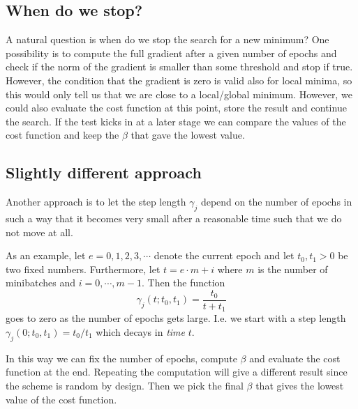 \documentclass[%
oneside,                 %
final,                   %
10pt]{article}
\begin{document}
\subsection*{When do we stop?}

A natural question is when do we stop the search for a new minimum?
One possibility is to compute the full gradient after a given number
of epochs and check if the norm of the gradient is smaller than some
threshold and stop if true. However, the condition that the gradient
is zero is valid also for local minima, so this would only tell us
that we are close to a local/global minimum. However, we could also
evaluate the cost function at this point, store the result and
continue the search. If the test kicks in at a later stage we can
compare the values of the cost function and keep the $\beta$ that
gave the lowest value.

\subsection*{Slightly different approach}

Another approach is to let the step length $\gamma_j$ depend on the
number of epochs in such a way that it becomes very small after a
reasonable time such that we do not move at all.

As an example, let $e = 0,1,2,3,\cdots$ denote the current epoch and let $t_0, t_1 > 0$ be two fixed numbers. Furthermore, let $t = e \cdot m + i$ where $m$ is the number of minibatches and $i=0,\cdots,m-1$. Then the function $$\gamma_j(t; t_0, t_1) = \frac{t_0}{t+t_1} $$ goes to zero as the number of epochs gets large. I.e. we start with a step length $\gamma_j (0; t_0, t_1) = t_0/t_1$ which decays in \emph{time} $t$.

In this way we can fix the number of epochs, compute $\beta$ and
evaluate the cost function at the end. Repeating the computation will
give a different result since the scheme is random by design. Then we
pick the final $\beta$ that gives the lowest value of the cost
function.
\end{document}
